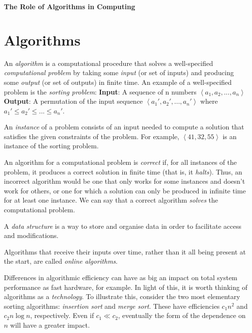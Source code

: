 \documentclass[12pt]{article}
\begin{document}
\begin{center}\LARGE\bf
    The Role of Algorithms in Computing
\end{center}

\section{Algorithms}
An \textit{algorithm} is a computational procedure that solves a well-specified \textit{computational problem} by taking some \textit{input} (or set
of inputs) and producing some \textit{output} (or set of outputs) in finite time. An example of a well-specified problem is the \textit{sorting
problem}:
\newline\textbf{Input}: A sequence of n numbers $\left\langle a_1, a_2, ..., a_n\right\rangle$
\newline\textbf{Output}: A permutation of the input sequence $\left\langle a_1', a_2', ..., a_n' \right\rangle$ where $a_1' \leq  a_2' \leq ... \leq a_n'$.

An \textit{instance} of a problem consists of an input needed to compute a solution that satisfies the given constraints of the problem. For example,
$\left\langle 41, 32, 55 \right\rangle$ is an instance of the sorting problem.

An algorithm for a computational problem is \textit{correct} if, for all instances of the problem, it produces a correct solution in finite time (that is, it \textit{halts}). Thus,
an incorrect algorithm would be one that only works for some instances and doesn't work for others, or one for which a solution can only be produced in
infinite time for at least one instance. We can say that a correct algorithm \textit{solves} the computational problem.

A \textit{data structure} is a way to store and organise data in order to facilitate access and modifications.

Algorithms that receive their inputs over time, rather than it all being present at the start, are called \textit{online algorithms}.

Differences in algorithmic efficiency can have as big an impact on total system performance as fast hardware, for example.
In light of this, it is worth thinking of algorithms as a \textit{technology}. To illustrate this, consider the two
most elementary sorting algorithms: \textit{insertion sort} and \textit{merge sort}. These have efficiencies $c_1n^2$ and $c_2n\log n$, respectively.
Even if $c_1 \ll c_2$, eventually the form of the dependence on $n$ will have a greater impact.
\end{document}
